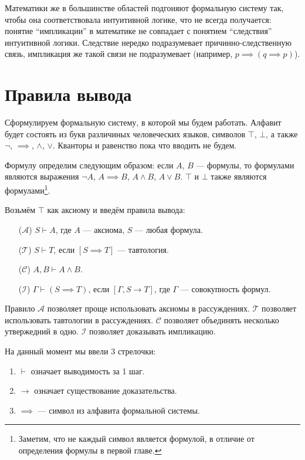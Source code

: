 Математики же
в большинстве областей подгоняют формальную систему так,
чтобы она соответствовала интуитивной логике,
что не всегда получается: понятие ``импликации'' в математике не совпадает
с понятием ``следствия'' интуитивной логики. Следствие
нередко подразумевает причинно-следственную
связь, импликация же такой связи не подразумевает (например, ${p\implies(q\implies p)}$).

\section{Правила вывода}

Сформулируем формальную систему, в которой мы будем работать.
Алфавит будет состоять из букв различиных человеческих языков, символов $\top$,
$\bot$, а также $\lnot$, $\implies$, $\land$, $\lor$. Кванторы и равенство пока
что вводить не будем.

Формулу определим следующим образом: если $A$, $B$ --- формулы, то формулами
являются выражения $\lnot A$, ${A\implies B}$, $A\land B$, $A\lor B$.
$\top$ и $\bot$ также являются формулами\footnote{
	Заметим, что не каждый символ является формулой, в отличие от определения
	формулы в первой главе.
}.

Возьмём $\top$ как аксиому и введём правила вывода:

\newcommand\taut{$\mathcal T$}
\newcommand\axiom{$\mathcal A$}
\newcommand\conj{$\mathcal C$}
\newcommand\implic{$\mathcal I$}
\begin{enumerate}
	\item[(\axiom)]{}$S\vdash A$, где $A$ --- аксиома, $S$ --- любая формула.
	\item[(\taut)]{}$S\vdash T$, если ${[S\implies T]}$ --- тавтология.
	\item[(\conj)]{}$A,B\vdash A\land B$.
	\item[(\implic)]{}${\Gamma\vdash (S\implies T)}$, если $[\Gamma,S\to T]$, где $\Gamma$
	--- совокупность формул.
\end{enumerate}

\pagebreak

Правило \axiom{} позволяет проще использовать аксиомы в рассуждениях.
\taut{} позволяет использовать тавтологии в рассуждениях.
\conj{} позволяет объединять несколько утвержедний в одно.
\implic{} позволяет доказывать импликацию.

На данный момент мы ввели 3 стрелочки:
\begin{enumerate}
	\item{}$\vdash$ означает выводимость за 1 шаг.
	\item{}$\to$ означает существование доказательства.
	\item{}$\implies$ --- символ из алфавита формальной системы.
\end{enumerate}

